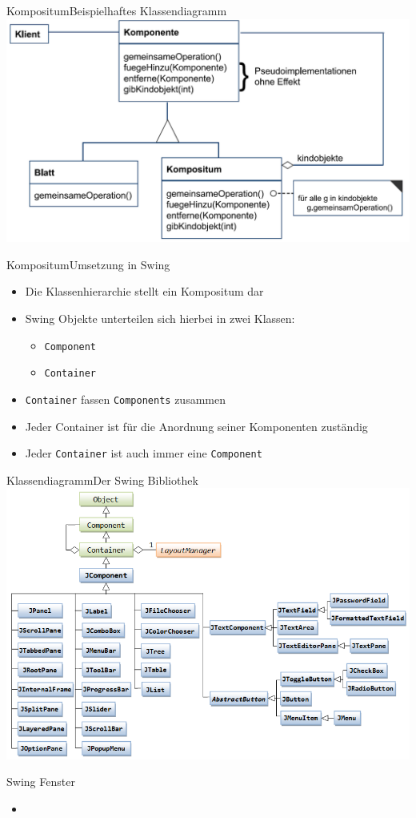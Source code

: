 \begin{frame}{Kompositum}{Beispielhaftes Klassendiagramm}
	\includegraphics*[width=.8\textwidth]{graph/compositum_cd}
\end{frame}

\begin{frame}{Kompositum}{Umsetzung in Swing}
	\begin{itemize}
		\item Die Klassenhierarchie stellt ein Kompositum dar
		\item Swing Objekte unterteilen sich hierbei in zwei Klassen:
		\begin{itemize}
			\item \texttt{Component}
			\item \texttt{Container}
		\end{itemize}
		\item \texttt{Container} fassen \texttt{Components} zusammen
		\item Jeder Container ist für die Anordnung seiner Komponenten zuständig
		\item Jeder \texttt{Container} ist auch immer eine \texttt{Component}
	\end{itemize}
\end{frame}

\begin{frame}{Klassendiagramm}{Der Swing Bibliothek}
	\includegraphics*[width=.8\textwidth]{graph/swing_cd}
\end{frame}

\begin{frame}{Swing Fenster}
	\begin{itemize}
		\item 
	\end{itemize}
\end{frame}
